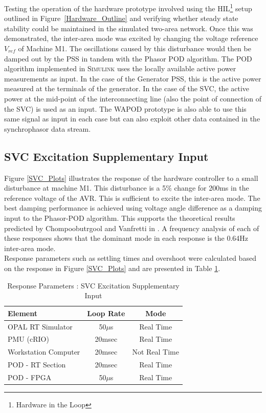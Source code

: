 \documentclass[journal]{IEEEtran}
\begin{document}
Testing the operation of the hardware prototype involved using the HIL\footnote{Hardware in the Loop} setup outlined in Figure~\ref{Hardware_Outline} and verifying whether steady state stability could be maintained in the simulated two-area network. Once this was demonstrated, the inter-area mode was excited by changing the voltage reference $V_{ref}$ of Machine M1. The oscillations caused by this disturbance would then be damped out by the PSS in tandem with the Phasor POD algorithm. The POD algorithm implemented in \textsc{Simulink} uses the locally available active power measurements as input. In the case of the Generator PSS, this is the active power measured at the terminals of the generator. In the case of the SVC, the active power at the mid-point of the interconnecting line (also the point of connection of the SVC) is used as an input. The WAPOD prototype is also able to use this same signal as input in each case but can also exploit other data contained in the synchrophasor data stream.

\subsection{SVC Excitation Supplementary Input}
Figure \ref{SVC_Plots} illustrates the response of the hardware controller to a small disturbance at machine M1. This disturbance is a 5\% change for 200ms in the reference voltage of the AVR. This is sufficient to excite the inter-area mode. The best damping performance is achieved using voltage angle difference as a damping input to the Phasor-POD algorithm. This supports the theoretical results predicted by Chompoobutrgool and Vanfretti in \cite{Yuwa}. A frequency analysis of each of these responses shows that the dominant mode in each response is the 0.64Hz inter-area mode.\\

Response parameters such as settling times and overshoot were calculated based on the response in Figure \ref{SVC_Plots} and are presented in Table \ref{SVCResponseTable}.\\

\begin{table}[!ht]
\caption{Response Parameters : SVC Excitation Supplementary Input}\label{SVCResponseTable}
\begin{center}
\begin{tabular}{|l|c|c|}
\hline \textbf{Element} & \textbf{Loop Rate} & \textbf{Mode} \\
\hline OPAL RT Simulator & 50$\mu$s & Real Time \\ 
\hline PMU (cRIO) & 20msec & Real Time \\ 
\hline Workstation Computer& 20msec & Not Real Time \\ 
\hline POD - RT Section & 20msec & Real Time \\ 
\hline POD - FPGA & 50$\mu$s & Real Time \\ 
\hline 
\end{tabular}
\end{center}
\end{table}  
\end{document}
